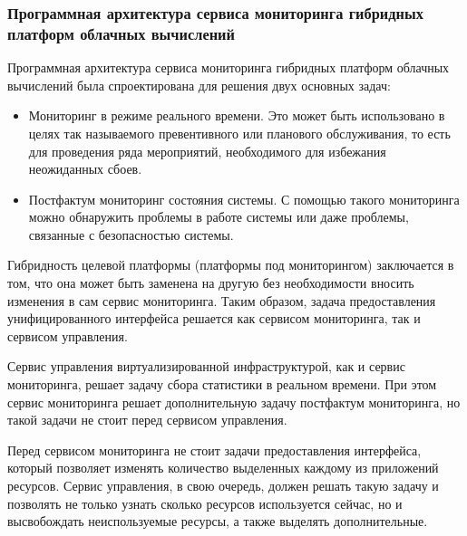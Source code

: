 \subsubsection*{Программная архитектура сервиса мониторинга гибридных платформ облачных вычислений}
Программная архитектура сервиса мониторинга гибридных платформ облачных вычислений \cite{hybrid-cloud-computing-monitoring-software-architecture} была спроектирована для решения двух основных задач:
\begin{itemize} 
    \item Мониторинг в режиме реального времени. Это может быть использовано в целях так называемого превентивного или планового обслуживания, то есть для проведения ряда мероприятий, необходимого для избежания неожиданных сбоев.
    \item Постфактум мониторинг состояния системы. С помощью такого мониторинга можно обнаружить проблемы в работе системы или даже проблемы, связанные с безопасностью системы.
\end{itemize} 
Гибридность целевой платформы (платформы под мониторингом) заключается в том, что она может быть заменена на другую без необходимости вносить изменения в сам сервис мониторинга. 
Таким образом, задача предоставления унифицированного интерфейса решается как сервисом мониторинга, так и сервисом управления.

Сервис управления виртуализированной инфраструктурой, как и сервис мониторинга, решает задачу сбора статистики в реальном времени. 
При этом сервис мониторинга решает дополнительную задачу постфактум мониторинга, но такой задачи не стоит перед сервисом управления.

Перед сервисом мониторинга не стоит задачи предоставления интерфейса, который позволяет изменять количество выделенных каждому из приложений ресурсов. 
Сервис управления, в свою очередь, должен решать такую задачу и позволять не только узнать сколько ресурсов используется сейчас, но и высвобождать неиспользуемые ресурсы, а также выделять дополнительные.